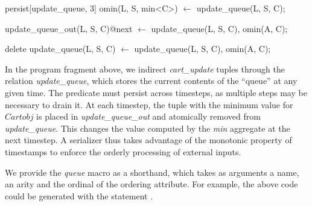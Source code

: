\begin{Dedalus}
persist[update_queue, 3]
omin(L, S, min<C>) \(\leftarrow\)
  update_queue(L, S, C);

update_queue_out(L, S, C)@next \(\leftarrow\)
  update_queue(L, S, C), omin(A, C);

delete update_queue(L, S, C) \(\leftarrow\)
  update_queue(L, S, C), omin(A, C);
\end{Dedalus}

In the program fragment above, we indirect {\em cart\_update} tuples through the relation
{\em update\_queue}, which stores the current contents of the ``queue''  at 
any given time.  The predicate must persist across timesteps, as multiple steps may be
necessary to drain it.  At each timestep, the tuple with the minimum value for $Cartobj$
is placed in {\em update\_queue\_out} and atomically removed from {\em update\_queue}.
This changes the value computed by the {\em min} aggregate at the next timestep.
A serializer thus takes advantage of the monotonic property of timestamps to enforce the
orderly processing of external inputs.

We provide the {\em queue} macro as a shorthand, which takes as arguments a name,
an arity and the ordinal of the ordering attribute.
For example, the above code could be generated with the statement 
.

